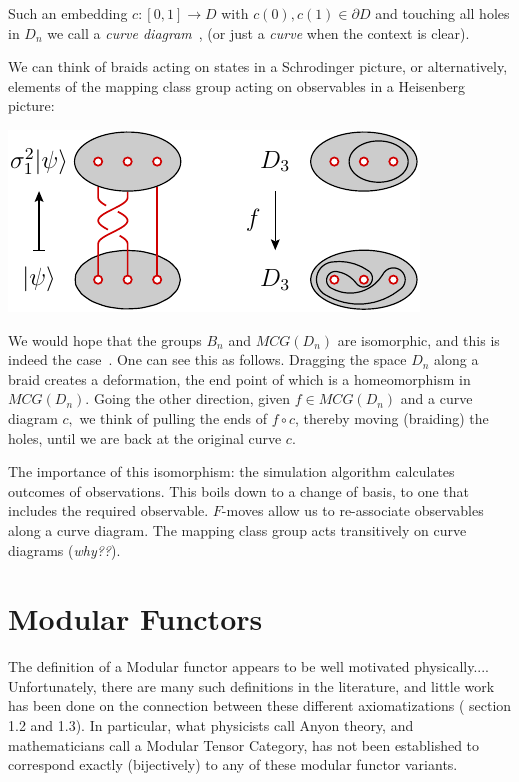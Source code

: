 \documentclass[aps, prl, letterpaper, twocolumn, superscriptaddress, notitlepage, 10pt]{revtex4-1}
\begin{document}
Such an embedding $c : [0, 1] \to D$ with $c(0), c(1) \in \partial D$
and touching all holes in $D_n$ we call a \emph{curve diagram}~\cite{Dehornoy2002},
(or just a \emph{curve} when the context is clear).

We can think of braids acting on states in a Schrodinger picture,
or alternatively, elements of the mapping class group acting on
observables in a Heisenberg picture:
\begin{center}
\includegraphics[]{pic-interaction.pdf}
\end{center}

We would hope that the groups $B_n$ and $MCG(D_n)$ are
isomorphic, and this is indeed the case~\cite{Kassel2010}.
One can see this as follows. Dragging the space $D_n$ along
a braid creates a deformation, the end point of which is a
homeomorphism in $MCG(D_n).$ Going the other direction,
given $f\in MCG(D_n)$ and a curve diagram $c,$ we think of
pulling the ends of $f\circ c$, thereby moving (braiding) the holes,
until we are back at the original curve $c.$


The importance of this isomorphism: the simulation
algorithm calculates outcomes of observations. This
boils down to a change of basis, to one that includes
the required observable.
$F$-moves allow us to re-associate observables along
a curve diagram. The mapping class group acts
transitively on curve diagrams (\emph{why??}).

%
%

\section{Modular Functors}

The definition of a Modular functor appears to
be well motivated physically....
Unfortunately, there are many such definitions
in the literature, and little work has been done
on the connection between these different axiomatizations
(\cite{Bartlett2015} section 1.2 and 1.3).
In particular, what physicists call Anyon theory,
and mathematicians call a Modular Tensor Category,
has not been established to correspond exactly
(bijectively) to any of these modular functor
variants.
\end{document}
